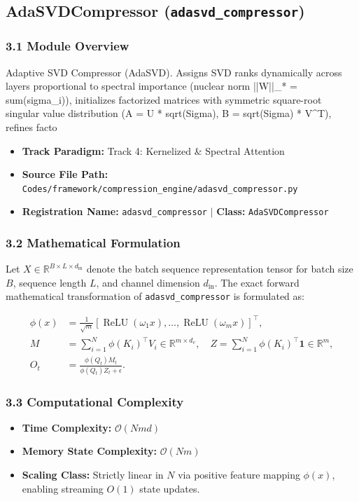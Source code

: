\subsection{AdaSVDCompressor (\texttt{adasvd\_compressor})}
\label{sec:app_module_adasvd\_compressor}

\subsubsection*{3.1 Module Overview}
Adaptive SVD Compressor (AdaSVD).  Assigns SVD ranks dynamically across layers proportional to spectral importance (nuclear norm ||W||\_* = sum(sigma\_i)), initializes factorized matrices with symmetric square-root singular value distribution (A = U * sqrt(Sigma), B = sqrt(Sigma) * V^T), refines facto
\begin{itemize}
    \item \textbf{Track Paradigm:} Track 4: Kernelized & Spectral Attention
    \item \textbf{Source File Path:} \texttt{Codes/framework/compression\_engine/adasvd\_compressor.py}
    \item \textbf{Registration Name:} \texttt{adasvd\_compressor} $\mid$ \textbf{Class:} \texttt{AdaSVDCompressor}
\end{itemize}

\subsubsection*{3.2 Mathematical Formulation}
Let $X \in \mathbb{R}^{B \times L \times d_{\text{in}}}$ denote the batch sequence representation tensor for batch size $B$, sequence length $L$, and channel dimension $d_{\text{in}}$. The exact forward mathematical transformation of \texttt{adasvd\_compressor} is formulated as:

\begin{align}
\phi(x) &= \frac{1}{\sqrt{m}} \left[ \operatorname{ReLU}(\omega_1 x), \dots, \operatorname{ReLU}(\omega_m x) \right]^\top, \\
M &= \sum_{i=1}^N \phi(K_i)^\top V_i \in \mathbb{R}^{m \times d_v}, \quad Z = \sum_{i=1}^N \phi(K_i)^\top \mathbf{1} \in \mathbb{R}^m, \\
O_t &= \frac{\phi(Q_t) M_t}{\phi(Q_t) Z_t + \epsilon}.
\end{align}


\subsubsection*{3.3 Computational Complexity}
\begin{itemize}
    \item \textbf{Time Complexity:} $\mathcal{O}(N m d)$
    \item \textbf{Memory State Complexity:} $\mathcal{O}(N m)$
    \item \textbf{Scaling Class:} Strictly linear in $N$ via positive feature mapping $\phi(x)$, enabling streaming $O(1)$ state updates.
\end{itemize}

